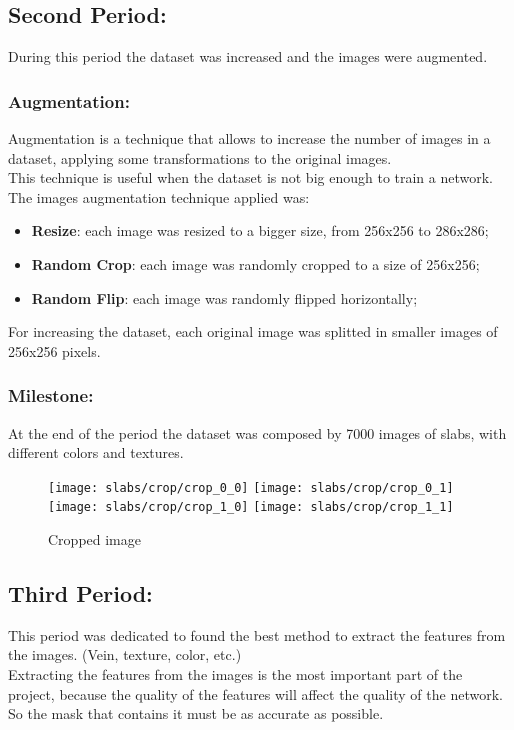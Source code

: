 \subsection{Second Period:}
During this period the dataset was increased and the images were augmented.\\
\subsubsection{Augmentation:}
Augmentation is a technique that allows to increase the number of images in a dataset, applying some transformations to the original images.\\
This technique is useful when the dataset is not big enough to train a network.\\

The images augmentation technique applied was:
\begin{itemize}
    \item  \textbf{Resize}: each image was resized to a bigger size, from 256x256 to 286x286;
    \item  \textbf{Random Crop}: each image was randomly cropped to a size of 256x256;
    \item  \textbf{Random Flip}: each image was randomly flipped horizontally;
\end{itemize}

For increasing the dataset, each original image was splitted in smaller images of 256x256 pixels.\\

\subsubsection{Milestone:}

At the end of the period the dataset was composed by 7000 images of slabs, with different colors and textures.


\begin{figure}
    \centering
    \texttt{[image: slabs/crop/crop\_0\_0]}
    \texttt{[image: slabs/crop/crop\_0\_1]}
    \\
    \texttt{[image: slabs/crop/crop\_1\_0]}
    \texttt{[image: slabs/crop/crop\_1\_1]}
    \caption{Cropped image}\label{fig:foobar}
\end{figure}

\subsection{Third Period:}
This period was dedicated to found the best method to extract the features from the images. (Vein, texture, color, etc.)\\
Extracting the features from the images is the most important part of the project, because the quality of the features will affect the quality of the network.\\
So the mask that contains it must be as accurate as possible.\\

